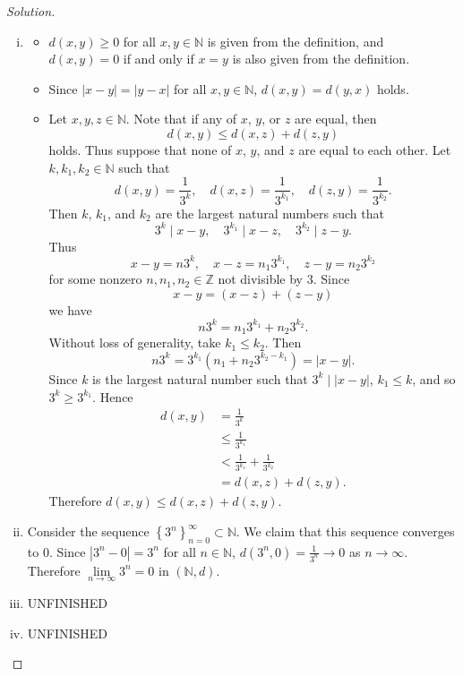 \documentclass[12pt]{article}
\newcommand{\n}{\mathbb{N}}
\newcommand{\z}{\mathbb{Z}}
\newcommand\paren[1]{\left( #1 \right)}
\newcommand\setb[1]{\left \{ #1 \right \}}
\theoremstyle{definition}
\begin{document}
\begin{proof}[Solution]
    \noindent
    \begin{enumerate}[(i)]
        \item 
        \noindent
        \begin{itemize}
            \item $d(x,y) \geq 0$ for all $x, y \in \n$ is given from the definition, and $d(x,y) = 0$ if and only if $x = y$ is also given from the definition.
            \item Since $|x-y| = |y-x|$ for all $x,y \in \n$, $d(x,y) = d(y,x)$ holds.
            \item Let $x , y , z \in \n$. Note that if any of $x$, $y$, or $z$ are equal, then 
            \[
                d(x,y) \leq d(x,z) + d(z,y)
            \]
            holds. Thus suppose that none of $x$, $y$, and $z$ are equal to each other. Let $k , k_1 , k_2 \in \n$ such that 
            \[
                d(x,y) = \frac{1}{3^k} , \quad d(x,z) = \frac{1}{3^{k_1}} , \quad d(z,y) = \frac{1}{3^{k_2}}.
            \]
            Then $k$, $k_1$, and $k_2$ are the largest natural numbers such that 
            \[
                3^k \mid x - y  , \quad 3^{k_1} \mid x - z , \quad 3^{k_2} \mid z - y.
            \]
            Thus 
            \[
                x - y = n 3^k , \quad x - z = n_1 3^{k_1}, \quad z - y = n_2 3^{k_2}
            \]
            for some nonzero $n , n_1 , n_2 \in \z$ not divisible by 3. Since 
            \[
                 x - y = (x-z) + (z-y) 
            \]
            we have 
            \[
                n 3^k = n_1 3^{k_1} + n_2 3^{k_2}.
            \]
            Without loss of generality, take $k_1 \leq k_2$. Then 
            \[
                n 3^k = 3^{k_1} \paren{n_1 + n_2 3^{k_2 - k_1}} = |x - y|.
            \]
            Since $k$ is the largest natural number such that $3^k \mid |x - y|$, $k_1 \leq k$, and so $3^k \geq 3^{k_1}$. Hence
            \begin{align*}
                d(x,y) & = \frac{1}{3^k} \\
                & \leq \frac{1}{3^{k_1}} \\
                & < \frac{1}{3^{k_1}} + \frac{1}{3^{k_2}} \\
                & = d(x,z) + d(z,y).
            \end{align*}
            Therefore $d(x,y) \leq d(x,z) + d(z,y)$.
        \end{itemize}
        \item Consider the sequence $\setb{ 3^n }_{n = 0}^{\infty} \subset \n$. We claim that this sequence converges to 0. Since $|3^n - 0| = 3^n$ for all $n \in \n$, $d(3^n,0) = \frac{1}{3^n} \to 0$ as $n \to \infty$. Therefore $\lim\limits_{n \to \infty} 3^n = 0$ in $(\n,d)$.
        \item UNFINISHED
        \item UNFINISHED
    \end{enumerate}
\end{proof}
\end{document}
